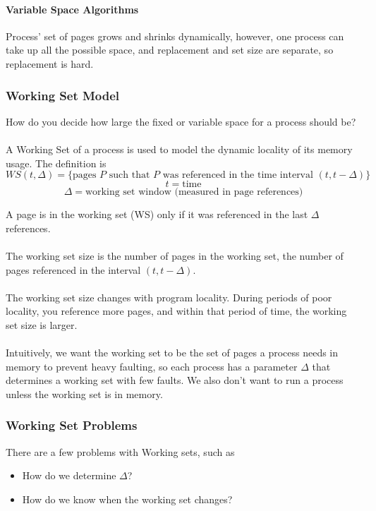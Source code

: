 \documentclass{article}
\begin{document}
\paragraph{Variable Space Algorithms} Process' set of pages grows and shrinks dynamically, however, one process can take up all the possible space, and replacement and set size are separate, so replacement is hard.

\subsubsection{Working Set Model}

How do you decide how large the fixed or variable space for a process should be?\\
\\
A Working Set of a process is used to model the dynamic locality of its memory usage. The definition is
$$WS(t,\Delta) = \{ \text{pages $P$ such that $P$ was referenced in the time interval $(t, t-\Delta)$} \}$$
$$t=\text{time}$$
$$\Delta = \text{working set window (measured in page references)}$$

A page is in the working set (WS) only if it was referenced in the last $\Delta$ references.\\
\\
The working set size is the number of pages in the working set, the number of pages referenced in the interval $(t,t-\Delta)$.\\
\\
The working set size changes with program locality. During periods of poor locality, you reference more pages, and within that period of time, the working set size is larger.\\
\\
Intuitively, we want the working set to be the set of pages a process needs in memory to prevent heavy faulting, so each process has a parameter $\Delta$ that determines a working set with few faults. We also don't want to run a process unless the working set is in memory.

\subsubsection{Working Set Problems}

There are a few problems with Working sets, such as
\begin{itemize}
  \item How do we determine $\Delta$?
  \item How do we know when the working set changes?
\end{itemize}
\end{document}
